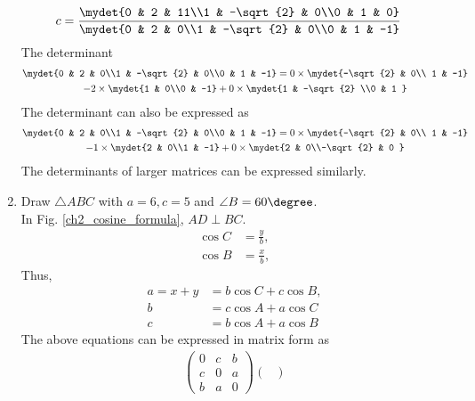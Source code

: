 \begin{enumerate}[label=\arabic*.,ref=\thesubsection.\theenumi]
\begin{align}
\\
c &= \frac{\mydet{0 & 2 & 11\\1 & -\sqrt{2} & 0\\0 & 1 & 0}}{\mydet{0 & 2 & 0\\1 & -\sqrt{2} & 0\\0 & 1 & -1}} 
\end{align}
The determinant
\begin{multline}
\mydet{0 & 2 & 0\\1 & -\sqrt{2} & 0\\0 & 1 & -1} = 0\times \mydet{-\sqrt{2} & 0\\ 1 & -1} 
\\
-2 \times  \mydet{1 &  0\\0 &  -1} + 0 \times \mydet{1 & -\sqrt{2} \\0 & 1 }
\end{multline}
%
The determinant can also be expressed as
\begin{multline}
\mydet{0 & 2 & 0\\1 & -\sqrt{2} & 0\\0 & 1 & -1} = 0\times \mydet{-\sqrt{2} & 0\\ 1 & -1} 
\\
-1 \times  \mydet{2 &  0\\1 &  -1} + 0 \times \mydet{2 & 0\\-\sqrt{2} & 0 }
\end{multline}
%
The determinants of larger matrices can be expressed similarly.
\item Draw $\triangle ABC$ with $a = 6, c = 5$ and $\angle B = 60 \degree$. 
\\
\solution 
In Fig. \eqref{ch2_cosine_formula}, $AD \perp BC$.
\begin{align}
\cos C &= \frac{y}{b},
\\
\cos B &= \frac{x}{b},
\end{align}
%
Thus, 
%
\begin{align}
a=x+y &= b \cos C + c \cos B, \\
b &= c \cos A + a \cos C \\
c &= b \cos A + a \cos B
\end{align}
%
  The above equations can be expressed in matrix form as
%
\begin{align}
\begin{pmatrix}
0 & c & b \\
c & 0 & a \\
b & a & 0
\end{pmatrix}
\begin{pmatrix}

\end{pmatrix}
\end{align}
\end{enumerate}
